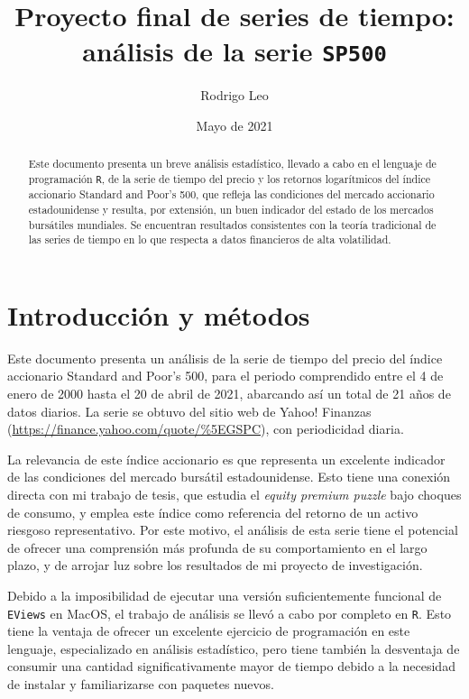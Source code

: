 \documentclass{article}
\begin{document}
\title{Proyecto final de series de tiempo:\\análisis de la serie \texttt{SP500}}
\author{Rodrigo Leo}
\date{Mayo de 2021}
\maketitle

\begin{abstract}
Este documento presenta un breve análisis estadístico, llevado a cabo en el lenguaje de programación \texttt{R}, de la serie de tiempo del precio y los retornos logarítmicos del índice accionario Standard and Poor's 500, que refleja las condiciones del mercado accionario estadounidense y resulta, por extensión, un buen indicador del estado de los mercados bursátiles mundiales. Se encuentran resultados consistentes con la teoría tradicional de las series de tiempo en lo que respecta a datos financieros de alta volatilidad.
\end{abstract}

\newpage
\tableofcontents

\newpage
\section{Introducción y métodos}

Este documento presenta un análisis de la serie de tiempo del precio del índice accionario Standard and Poor's 500, para el periodo comprendido entre el 4 de enero de 2000 hasta el 20 de abril de 2021, abarcando así un total de 21 años de datos diarios. La serie se obtuvo del sitio web de Yahoo! Finanzas (\url{https://finance.yahoo.com/quote/%5EGSPC}), con periodicidad diaria.

La relevancia de este índice accionario es que representa un excelente indicador de las condiciones del mercado bursátil estadounidense. Esto tiene una conexión directa con mi trabajo de tesis, que estudia el \emph{equity premium puzzle} bajo choques de consumo, y emplea este índice como referencia del retorno de un activo riesgoso representativo. Por este motivo, el análisis de esta serie tiene el potencial de ofrecer una comprensión más profunda de su comportamiento en el largo plazo, y de arrojar luz sobre los resultados de mi proyecto de investigación.

Debido a la imposibilidad de ejecutar una versión suficientemente funcional de \texttt{EViews} en {MacOS}, el trabajo de análisis se llevó a cabo por completo en \texttt{R}. Esto tiene la ventaja de ofrecer un excelente ejercicio de programación en este lenguaje, especializado en análisis estadístico, pero tiene también la desventaja de consumir una cantidad significativamente mayor de tiempo debido a la necesidad de instalar y familiarizarse con paquetes nuevos.
\end{document}

